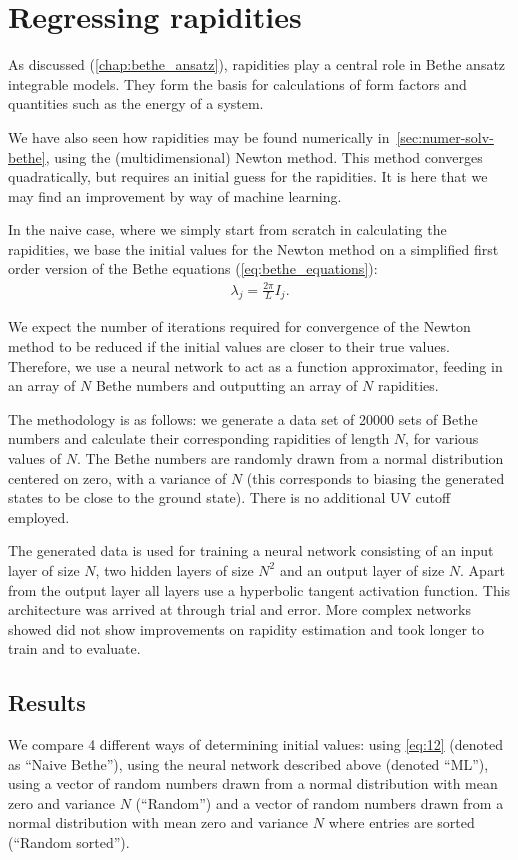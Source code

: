 \documentclass[11pt, a4paper]{report} %
\begin{document}
\section{Regressing rapidities}

As discussed (\cref{chap:bethe_ansatz}), rapidities play a central role in Bethe ansatz integrable models.
They form the basis for calculations of form factors and quantities such as the energy of a system.

We have also seen how rapidities may be found numerically in~\cref{sec:numer-solv-bethe}, using the (multidimensional) Newton method.
This method converges quadratically, but requires an initial guess for the rapidities.
It is here that we may find an improvement by way of machine learning.

In the naive case, where we simply start from scratch in calculating the rapidities, we base the initial values for the Newton method on a simplified first order version of the Bethe equations (\cref{eq:bethe_equations}):
\begin{align}
  \label{eq:12}
  \lambda_j = \frac{2\pi}{L} I_j.
\end{align}

We expect the number of iterations required for convergence of the Newton method to be reduced if the initial values are closer to their true values.
Therefore, we use a neural network to act as a function approximator, feeding in an array of \(N\) Bethe numbers and outputting an array of \(N\) rapidities.

The methodology is as follows: we generate a data set of 20000 sets of Bethe numbers and calculate their corresponding rapidities of length \(N\), for various values of \(N\).
The Bethe numbers are randomly drawn from a normal distribution centered on zero, with a variance of \(N\) (this corresponds to biasing the generated states to be close to the ground state).
There is no additional UV cutoff employed.

The generated data is used for training a neural network consisting of an input layer of size \(N\), two hidden layers of size \(N^2\) and an output layer of size \(N\).
Apart from the output layer all layers use a hyperbolic tangent activation function.
This architecture was arrived at through trial and error.
More complex networks showed did not show improvements on rapidity estimation and took longer to train and to evaluate.

\subsection{Results}
We compare 4 different ways of determining initial values: using \cref{eq:12} (denoted as ``Naive Bethe''), using the neural network described above (denoted ``ML''), using a vector of random numbers drawn from a normal distribution with mean zero and variance \(N\) (``Random'') and a vector of random numbers drawn from a normal distribution with mean zero and variance \(N\) where entries are sorted (``Random sorted'').
\end{document}
